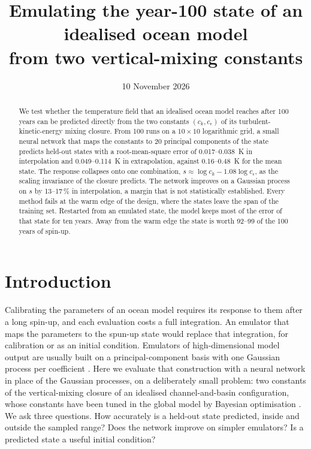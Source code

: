 \documentclass[11pt,a4paper]{article}
\title{Emulating the year-100 state of an idealised ocean model\\from two vertical-mixing constants}
\author{}
\date{10 November 2026}
\begin{document}
\maketitle

\begin{abstract}
\noindent We test whether the temperature field that an idealised ocean model reaches after 100 years can be
predicted directly from the two constants $(c_k, c_\epsilon)$ of its turbulent-kinetic-energy mixing closure. From
100 runs on a $10\times10$ logarithmic grid, a small neural network that maps the constants to 20 principal
components of the state predicts held-out states with a root-mean-square error of 0.017--\SI{0.038}{K} in
interpolation and 0.049--\SI{0.114}{K} in extrapolation, against 0.16--\SI{0.48}{K} for the mean state. The
response collapses onto one combination, $s \approx \log c_k - 1.08\log c_\epsilon$, as the scaling invariance of
the closure predicts. The network improves on a Gaussian process on $s$ by 13--17\,\% in interpolation, a
margin that is not statistically established. Every method fails at the warm edge of the design, where the states leave
the span of the training set. Restarted from an emulated state, the model keeps most of the error of that state for
ten years. Away from the warm edge the state is worth 92--99 of the 100 years of spin-up.
\end{abstract}

\section{Introduction}

Calibrating the parameters of an ocean model requires its response to them after a long spin-up, and each
evaluation costs a full integration. An emulator that maps the parameters to the spun-up state would replace
that integration, for calibration or as an initial condition. Emulators of high-dimensional model output are
usually built on a principal-component basis with one Gaussian process per coefficient \cite{higdon2008}. Here we
evaluate that construction with a neural network in place of the Gaussian processes, on a deliberately small
problem: two constants of the vertical-mixing closure of an idealised channel-and-basin configuration, whose
constants have been tuned in the global model by Bayesian optimisation \cite{mrozowska2025}. We ask three questions. How
accurately is a held-out state predicted, inside and outside the sampled range? Does the network improve on
simpler emulators? Is a predicted state a useful initial condition?
\end{document}
